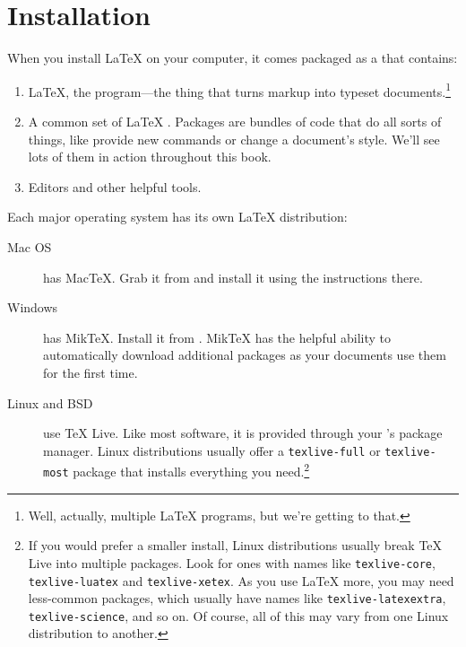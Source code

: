 \chapter{Installation}
\label{installation}

When you install \LaTeX{} on your computer, it comes packaged as a
 that contains:
\begin{enumerate}
\item \LaTeX, the program---the thing that turns markup into
    typeset documents.\punckern\footnote{Well, actually, multiple \LaTeX{} programs,
    but we're getting to that.}
\item A common set of \LaTeX{} .
    Packages are bundles of code that do all sorts of things,
    like provide new commands or change a document's style.
    We'll see lots of them in action throughout this book.
\item Editors and other helpful tools.
\end{enumerate}
Each major operating system has its own \LaTeX{} distribution:
\begin{description}
\item[Mac OS] has Mac\TeX. Grab it from 
    and install it using the instructions there.

\item[Windows] has Mik\TeX.
    Install it from .
    Mik\TeX{} has the helpful ability to automatically download
    additional packages as your documents use them for the first time.

\item[Linux and BSD] use \TeX{} Live.
    Like most software, it is provided through your
    's package manager.
    Linux distributions usually offer a \texttt{texlive-\allowbreak full}
    or \texttt{texlive-\allowbreak most} package that installs everything
    you need.\punckern\footnote{%
    If you would prefer a smaller install,
    Linux distributions usually break \TeX{} Live into multiple packages.
    Look for ones with names like
    \texttt{texlive-\allowbreak core}, \texttt{texlive-\allowbreak luatex}
    and \texttt{texlive-\allowbreak xetex}.
    As you use \LaTeX{} more, you may need less-common packages,
    which usually have names like \texttt{texlive-\allowbreak latexextra},
    \texttt{texlive-\allowbreak science}, and so on.
    Of course, all of this may vary from one Linux distribution to another.}
\end{description}


